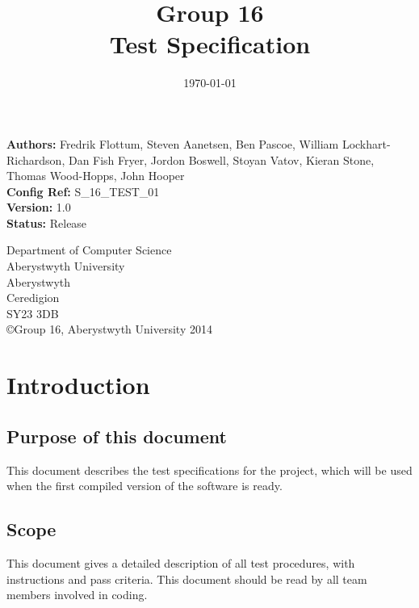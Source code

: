 \documentclass[10pt,a4paper]{article}
\begin{document}
\begin{titlepage}

\title{\textbf{Group 16\\Test Specification}}
\date{\today}
\clearpage\maketitle
\thispagestyle{empty}

\begin{raggedright}
\textbf{Authors:} Fredrik Flottum, Steven Aanetsen, Ben Pascoe, William Lockhart-Richardson, Dan Fish Fryer, Jordon Boswell, Stoyan Vatov, Kieran Stone, Thomas Wood-Hopps, John Hooper\\
\textbf{Config Ref:} S\_16\_TEST\_01\\
\textbf{Version:} 1.0\\
\textbf{Status:} Release\\

\end{raggedright}

\vfill
\begin{raggedright} Department of Computer Science\\
Aberystwyth University\\
Aberystwyth\\
Ceredigion\\
SY23 3DB\\
\copyright \thinspace  Group 16, Aberystwyth University 2014\\
\end{raggedright}

\end{titlepage}

\tableofcontents
\newpage

\section{Introduction}
\subsection{Purpose of this document}
This document describes the test specifications for the project, which will be used when the first compiled version of the software is ready.

\subsection{Scope}
This document gives a detailed description of all test procedures, with instructions and pass criteria. This document should be read by all team members involved in coding.
\end{document}
